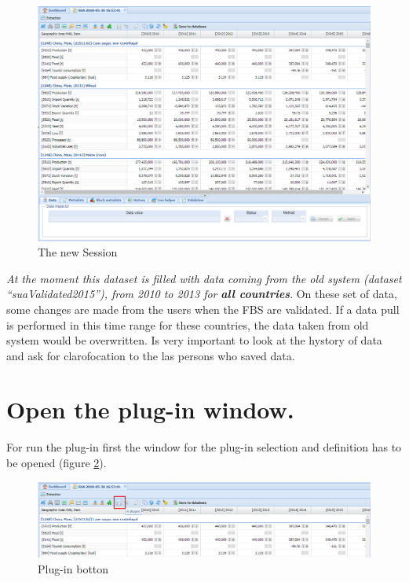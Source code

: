 \documentclass[]{article}
\begin{document}
\begin{figure}[H]

{\centering \includegraphics[width=1\linewidth]{images/pullData/11_session} 

}

\caption{\label{fig:f11}The new Session}\label{fig:f11}
\end{figure}

\emph{At the moment this dataset is filled with data coming from the old
system (dataset ``suaValidated2015''), from 2010 to 2013 for}
\textbf{\emph{all countries}}. On these set of data, some changes are
made from the users when the FBS are validated. If a data pull is
performed in this time range for these countries, the data taken from
old system would be overwritten. Is very important to look at the
hystory of data and ask for clarofocation to the las persons who saved
data.

\section{Open the plug-in window.}\label{open-the-plug-in-window.}

For run the plug-in first the window for the plug-in selection and
definition has to be opened (figure \ref{fig:f12}).

\begin{figure}[H]

{\centering \includegraphics[width=1\linewidth]{images/pullData/12_runPlugin} 

}

\caption{\label{fig:f12}Plug-in botton}\label{fig:f12}
\end{figure}
\end{document}
